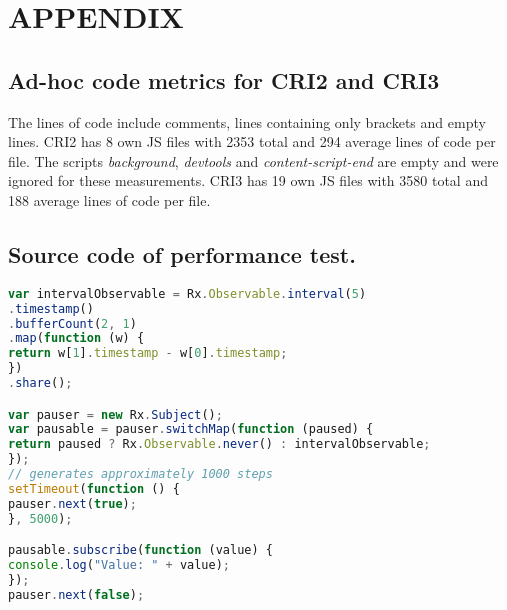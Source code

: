 \chapter{APPENDIX}
\label{ch:Appendix}
\section{Ad-hoc code metrics for CRI2 and CRI3}
The lines of code include comments, lines containing only brackets and empty lines.
CRI2 has 8 own JS files with 2353 total and 294 average lines of code per file. The scripts \emph{background}, \emph{devtools} and \emph{content-script-end} are empty and were ignored for these measurements.
CRI3 has 19 own JS files with 3580 total and 188 average lines of code per file.

\section{Source code of performance test.}
	\begin{lstlisting}[language=JavaScript, caption={RxJS code of PerformanceTest}]
var intervalObservable = Rx.Observable.interval(5)
.timestamp()
.bufferCount(2, 1)
.map(function (w) {
return w[1].timestamp - w[0].timestamp;
})
.share();

var pauser = new Rx.Subject();
var pausable = pauser.switchMap(function (paused) {
return paused ? Rx.Observable.never() : intervalObservable;
});
// generates approximately 1000 steps
setTimeout(function () {
pauser.next(true);
}, 5000);

pausable.subscribe(function (value) {
console.log("Value: " + value);
});
pauser.next(false);
\end{lstlisting}
